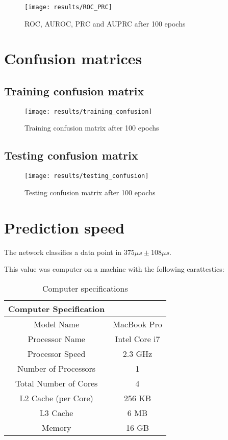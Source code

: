 \begin{figure}
	\texttt{[image: results/ROC\_PRC]}
	\caption{ROC, AUROC, PRC and AUPRC after 100 epochs}
\end{figure}

\section{Confusion matrices}

\subsection{Training confusion matrix}
\begin{figure}
	\texttt{[image: results/training\_confusion]}
	\caption{Training confusion matrix after 100 epochs}
\end{figure}

\subsection{Testing confusion matrix}
\begin{figure}
	\texttt{[image: results/testing\_confusion]}
	\caption{Testing confusion matrix after 100 epochs}
\end{figure}

\section{Prediction speed}
The network classifies a data point in \(375 \mu s \pm 108 \mu s\).

This value was computer on a machine with the following carattestics:

\begin{table}
	\begin{tabular}{|c|c|}
		\hline
		\textbf{Computer Specification}       \\
		\hline
		Model Name            & MacBook Pro   \\
		\hline
		Processor Name        & Intel Core i7 \\
		\hline
		Processor Speed       & 2.3 GHz       \\
		\hline
		Number of Processors  & 1             \\
		\hline
		Total Number of Cores & 4             \\
		\hline
		L2 Cache (per Core)   & 256 KB        \\
		\hline
		L3 Cache              & 6 MB          \\
		\hline
		Memory                & 16 GB         \\
		\hline
	\end{tabular}
	\caption{Computer specifications}
\end{table}

